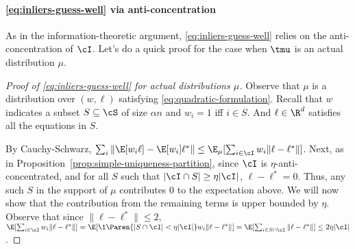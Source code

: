 \paragraph{\eqref{eq:inliers-guess-well} via anti-concentration} As in the information-theoretic argument, \eqref{eq:inliers-guess-well} relies on the anti-concentration of $\cI$.
Let's do a quick proof for the case when $\tmu$ is an actual distribution $\mu$.

\begin{proof}[Proof of \eqref{eq:inliers-guess-well} for actual distributions $\mu$]%
Observe that $\mu$ is a distribution over $(w,\ell)$ satisfying \eqref{eq:quadratic-formulation}. Recall that $w$ indicates a subset $S \subseteq \cS$ of size $\alpha n$ and $w_i = 1$ iff $i \in S$. And $\ell \in \R^d$ satisfies all the equations in $S$.

By Cauchy-Schwarz, $\sum_i \|\E[w_i \ell] - \E[w_i] \ell^*\| \leq \E_{\mu} [\sum_{i \in \cI} w_i \|\ell - \ell^*\|]$. 
Next, as in Proposition~\ref{prop:simple-uniqueness-partition}, since $\cI$ is $\eta$-anti-concentrated, and for all $S$ such that $|\cI \cap S| \geq \eta |\cI|$,  $\ell-\ell^*= 0$. Thus, any such $S$ in the support of $\mu$ contributes $0$ to the expectation above. We will now show that the contribution from the remaining terms is upper bounded by $\eta$. Observe that since $\|\ell-\ell^*\| \leq 2$, \\$\E [\sum_{i \in \cI} w_i \|\ell - \ell^*\|] = \E [\1\Paren{|S \cap \cI|< \eta |\cI|}w_i \|\ell - \ell^*\|] = \E [\sum_{i \in S \cap \cI} \|\ell - \ell^*\|]  \leq 2\eta |\cI|$.
\end{proof}





